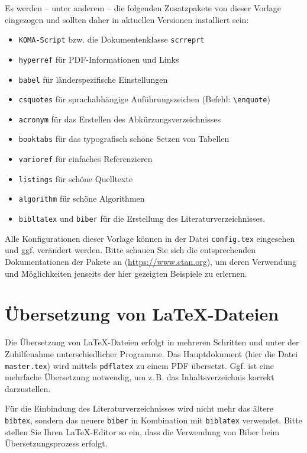 Es werden -- unter anderem -- die folgenden Zusatzpakete von dieser Vorlage eingezogen und sollten daher in aktuellen Versionen installiert sein: 
\begin{itemize}
	\item\texttt{KOMA-Script} bzw. die Dokumentenklasse \texttt{scrreprt}
	\item\texttt{hyperref} für PDF-Informationen und Links 
	\item \texttt{babel} für länderspezifische Einstellungen
	\item \texttt{csquotes} für sprachabhängige Anführungszeichen (Befehl: \texttt{\textbackslash enquote})
	\item \texttt{acronym} für das Erstellen des Abkürzungsverzeichnisses 
	\item \texttt{booktabs} für das typografisch schöne Setzen von Tabellen 
	\item \texttt{varioref} für einfaches Referenzieren 
	\item \texttt{listings} für schöne Quelltexte
	\item \texttt{algorithm} für schöne Algorithmen
	\item \texttt{bibltatex} und \texttt{biber} für die Erstellung des Literaturverzeichnisses.
\end{itemize}
Alle Konfigurationen dieser Vorlage können in der Datei \texttt{config.tex} eingesehen und ggf. verändert werden. Bitte schauen Sie sich die entsprechenden Dokumentationen 
der Pakete an (\url{https://www.ctan.org}), um deren Verwendung und Möglichkeiten jenseits der hier gezeigten Beispiele zu erlernen.


\section{Übersetzung von \LaTeX-Dateien}
Die Übersetzung von \LaTeX-Dateien erfolgt in mehreren Schritten und unter der Zuhilfenahme unterschiedlicher Programme. Das 
Hauptdokument (hier die Datei \texttt{master.tex}) wird mittels \texttt{pdflatex} zu einem PDF übersetzt. 
Ggf. ist eine mehrfache Übersetzung notwendig, um z.\,B. das Inhaltsverzeichnis korrekt darzustellen. 

Für die Einbindung des Literaturverzeichnisses wird nicht mehr das ältere \texttt{bibtex}, sondern das neuere \texttt{biber} in Kombination mit \texttt{biblatex} verwendet. Bitte stellen Sie Ihren \LaTeX-Editor so ein, dass die Verwendung von Biber beim Übersetzungsprozess erfolgt. 


